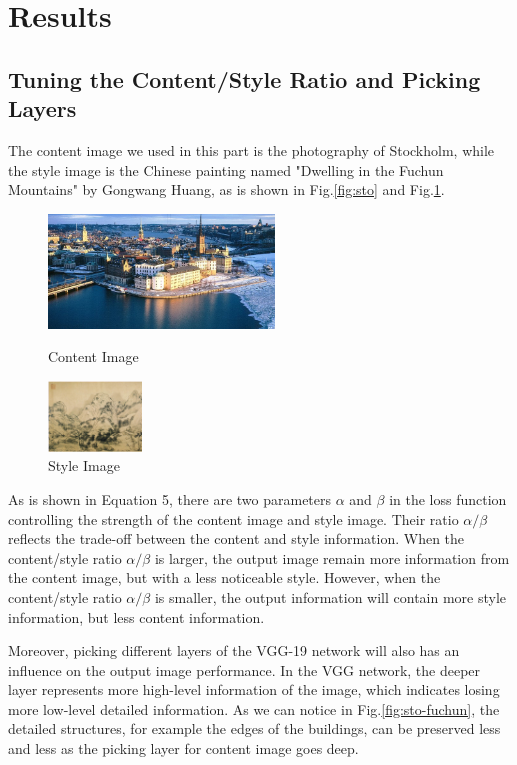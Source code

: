 \documentclass[runningheads]{llncs}
\begin{document}
\section{Results}
\subsection{Tuning the Content/Style Ratio and Picking Layers}
The content image we used in this part is the photography of Stockholm, while the style image is the Chinese painting  named "Dwelling in the Fuchun Mountains" by Gongwang Huang, as is shown in Fig.\ref{fig:sto} and Fig.\ref{fig:fuchun}.
\begin{figure}[htbp]
\centering
\begin{minipage}[t]{0.48\textwidth}
\centering
\includegraphics[width=6cm]{neural_style_transfer/img/fuchunshan_Stockholm/stockholm1.jpg}
\caption{Content Image}
\label{fig:sto}
\end{minipage}
\begin{minipage}[t]{0.48\textwidth}
\centering
\includegraphics[width=2.5cm]{neural_style_transfer/img/fuchunshan_Stockholm/fuchunshanjutu.jpg}
\caption{Style Image}
\label{fig:fuchun}
\end{minipage}
\end{figure}

As is shown in Equation 5, there are two parameters $\alpha$ and $\beta$ in the loss function controlling the strength of the content image and style image. Their ratio $\alpha/\beta$ reflects the trade-off between the content and style information. When the content/style ratio $\alpha/\beta$ is larger, the output image remain more information from the content image, but with a less noticeable style. However, when the content/style ratio $\alpha/\beta$ is smaller, the output information will contain more style information, but less content information.

Moreover, picking different layers of the VGG-19 network will also has an influence on the output image performance. In the VGG network, the deeper layer represents more high-level information of the image, which indicates losing more low-level detailed information. As we can notice in Fig.\ref{fig:sto-fuchun}, the detailed structures, for example the edges of the buildings, can be preserved less and less as the picking layer for content image goes deep.
\end{document}

